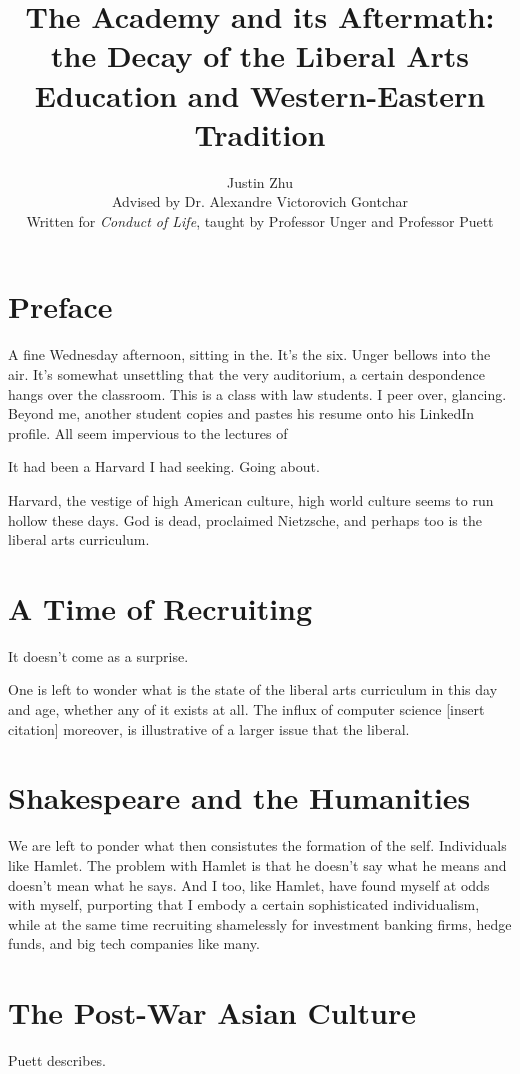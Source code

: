 \documentclass[12pt,letterpaper]{article}
\author{Justin Zhu \\ Advised by Dr. Alexandre Victorovich Gontchar \\ Written for \textit{Conduct of Life}, taught by Professor Unger and Professor Puett}
\title{The Academy and its Aftermath: the Decay of the Liberal Arts Education and Western-Eastern Tradition}
\date{}
\begin{document}
\clearpage\maketitle
\thispagestyle{empty}
\pagebreak
\tableofcontents

\pagebreak

\pagestyle{plain}
\setcounter{page}{1}


\section{Preface}
A fine Wednesday afternoon, sitting in the.   It's the six.  Unger bellows into the air.  It's somewhat unsettling that the very auditorium, a certain despondence hangs over the classroom.  This is a class with law students.  I peer over, glancing.  Beyond me, another student copies and pastes his resume onto his LinkedIn profile.  All seem impervious to the lectures of 

It had been a Harvard I had seeking.  Going about.

Harvard, the vestige of high American culture, high world culture seems to run hollow these days.  God is dead, proclaimed Nietzsche, and perhaps too is the liberal arts curriculum.

\section{A Time of Recruiting}
It doesn't come as a surprise.  

One is left to wonder what is the state of the liberal arts curriculum in this day and age, whether any of it exists at all.  The influx of computer science [insert citation] moreover, is illustrative of a larger issue that the liberal.

\section{Shakespeare and the Humanities}
We are left to ponder what then consistutes the formation of the self.  Individuals like Hamlet.  The problem with Hamlet is that he doesn't say what he means and doesn't mean what he says.  And I too, like Hamlet, have found myself at odds with myself, purporting that I embody a certain sophisticated individualism, while at the same time recruiting shamelessly for investment banking firms, hedge funds, and big tech companies like many.

\section{The Post-War Asian Culture}
Puett describes.  
\end{document}
